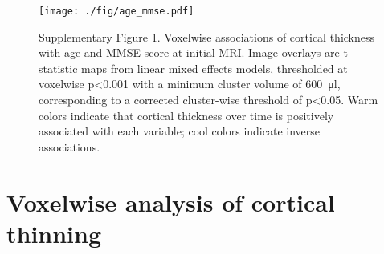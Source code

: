 \documentclass[]{article}
\begin{document}

\begin{figure}[]

{\centering \texttt{[image: ./fig/age\_mmse.pdf]} 

}

\caption[Age and global cognition associations]{Supplementary Figure 1. Voxelwise associations of cortical thickness with age and MMSE score at initial MRI. Image overlays are t-statistic maps from linear mixed effects models, thresholded at voxelwise p<0.001 with a minimum cluster volume of \SI{600}{\micro\litre}, corresponding to a corrected cluster-wise threshold of p<0.05. Warm colors indicate that cortical thickness over time is positively associated with each variable; cool colors indicate inverse associations. \label{age_mmse}}

\end{figure}

\section*{Voxelwise analysis of cortical
thinning}\label{voxelwise-analysis-of-cortical-thinning}
\end{document}
